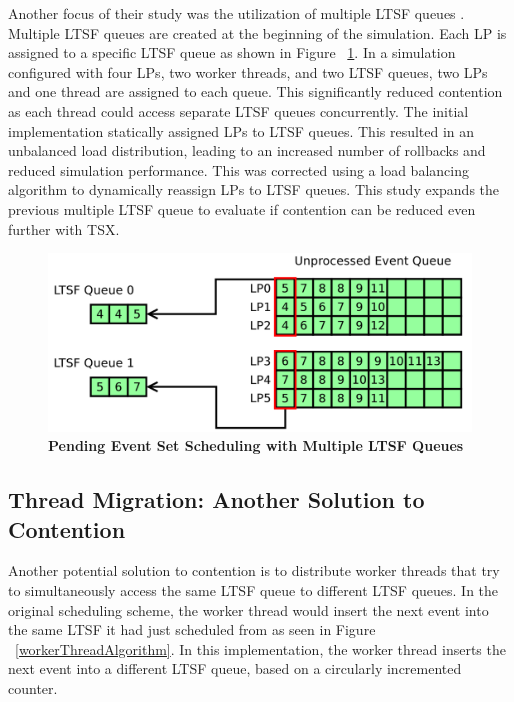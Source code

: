 \documentclass[a4paper]{article}
\begin{document}
Another focus of their study was the utilization of multiple LTSF queues
\cite{dickman}.  Multiple LTSF queues are created at the beginning of the
simulation.  Each LP is assigned to a specific LTSF queue as shown in Figure
~\ref{fig:multipleLTSF}.  In a simulation configured with four LPs, two worker
threads, and two LTSF queues, two LPs and one thread are assigned to each queue.
This significantly reduced contention as each thread could access separate LTSF
queues concurrently.  The initial implementation statically assigned LPs to LTSF
queues.  This resulted in an unbalanced load distribution, leading to an
increased number of rollbacks and reduced simulation performance.  This was
corrected using a load balancing algorithm to dynamically reassign LPs to LTSF
queues.  This study expands the previous multiple LTSF queue to evaluate if
contention can be reduced even further with TSX.
\par

\begin{figure}[H]
    \centering
    \graphicspath{ {./figures/} }
    \includegraphics[width=\textwidth,height=\textheight,keepaspectratio]{multiple_ltsf}
    \caption{\textbf{Pending Event Set Scheduling with Multiple LTSF Queues}}
    \label{fig:multipleLTSF}
\end{figure}

\subsection{\textbf{Thread Migration: Another Solution to Contention}}

Another potential solution to contention is to distribute worker threads that
try to simultaneously access the same LTSF queue to different LTSF queues.
In the original scheduling scheme, the worker thread would insert the next event
into the same LTSF it had just scheduled from as seen in Figure
~\ref{workerThreadAlgorithm}.  In this implementation, the worker thread inserts
the next event into a different LTSF queue, based on a circularly incremented
counter.
\end{document}
